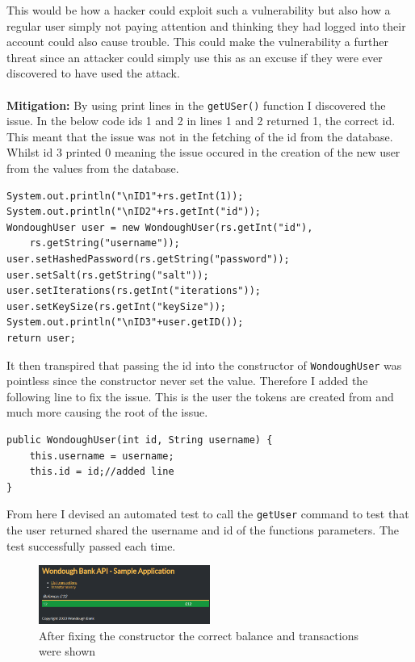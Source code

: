 This would be how a hacker could exploit such a vulnerability but also how a regular user simply not paying attention and thinking they had logged into their account could also
cause trouble. This could make the vulnerability a further threat since an attacker could simply use this as an excuse if they were ever discovered to have used the attack.\\ \\
\textbf{Mitigation:} By using print lines in the \verb|getUSer()| function I discovered the issue. In the below code ids 1 and 2 in lines 1 and 2 returned 1, the correct id. This
meant that the issue was not in the fetching of the id from the database. Whilst id 3 printed 0 meaning the issue occured in the creation of the new user from the values from
the database.
\begin{verbatim}
System.out.println("\nID1"+rs.getInt(1));
System.out.println("\nID2"+rs.getInt("id"));
WondoughUser user = new WondoughUser(rs.getInt("id"),
    rs.getString("username"));
user.setHashedPassword(rs.getString("password"));
user.setSalt(rs.getString("salt"));
user.setIterations(rs.getInt("iterations"));
user.setKeySize(rs.getInt("keySize"));
System.out.println("\nID3"+user.getID());
return user;
\end{verbatim}
It then transpired that passing the id into the constructor of \verb|WondoughUser| was pointless since the constructor never set the value. Therefore I added the following line
to fix the issue. This is the user the tokens are created from and much more causing the root of the issue.
\begin{verbatim}
public WondoughUser(int id, String username) {
    this.username = username;
    this.id = id;//added line
}
\end{verbatim}
From here I devised an automated test to call the \verb|getUser| command to test that the user returned shared the username and id of the functions parameters. The test successfully passed each time.
\begin{figure}[h]
    \centering
    \includegraphics[width=0.5\textwidth]{figs/hackerbalance.png}
    \caption{After fixing the constructor the correct balance and transactions were shown}
    \label{figvun6}
  \end{figure}
